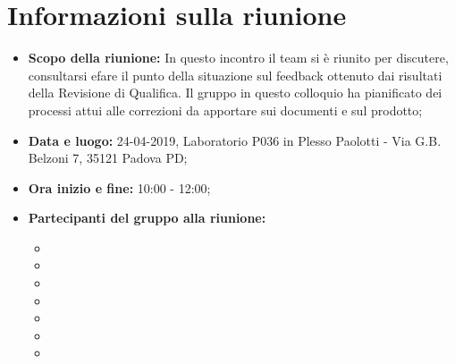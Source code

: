 \clearpage
\section{Informazioni sulla riunione}
\begin{itemize}
	\item \textbf {Scopo della riunione:} In questo incontro il team si è riunito per discutere, consultarsi efare il punto della situazione sul feedback ottenuto dai risultati della Revisione di Qualifica. Il gruppo in questo colloquio ha pianificato dei processi attui alle correzioni da apportare sui documenti e sul prodotto;
	\item \textbf {Data e luogo:} 24-04-2019, Laboratorio P036 in Plesso Paolotti - Via G.B. Belzoni 7, 35121 Padova PD;
	\item \textbf {Ora inizio e fine:} 10:00 - 12:00;
	\item \textbf {Partecipanti del gruppo alla riunione:} 
		 \begin{itemize}
			\item \sonia
			\item \pardeep
			\item \luca
			\item \matteo
			\item \alberto
			\item \alessandro
			\item \andrea
		\end{itemize}
\end{itemize}
